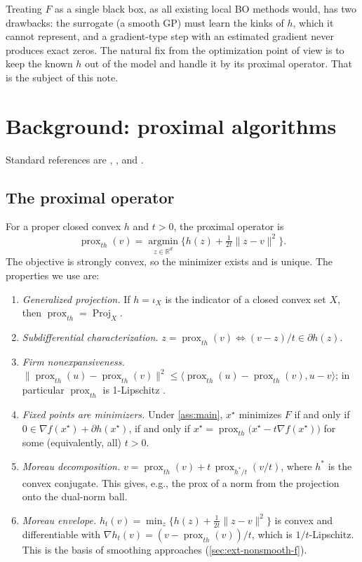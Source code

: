 \documentclass[10pt]{article}
\newcommand{\R}{\mathbb{R}}
\newcommand{\prox}{\operatorname{prox}}
\newcommand{\proj}{\operatorname{Proj}}
\theoremstyle{remark}
\begin{document}
Treating $F$ as a single black box, as all existing local BO methods would, has two drawbacks: the surrogate (a smooth GP) must learn the
kinks of $h$, which it cannot represent, and a gradient-type step with an estimated gradient never produces exact zeros. The natural fix
from the optimization point of view is to keep the known $h$ out of the model and handle it by its proximal operator. That is the subject of
this note.

\section{Background: proximal algorithms}\label{sec:prox}

Standard references are \citet{parikh2014prox}, \citet{combettes2011prox}, \citet{beck2017book} and \citet{bauschke2017book}.

\subsection{The proximal operator}
For a proper closed convex $h$ and $t>0$, the proximal operator \citep{moreau1965,parikh2014prox} is
\begin{equation}\label{eq:prox}
\prox_{th}(v) = \operatorname*{argmin}_{z\in\R^d}\Big\{ h(z) + \tfrac{1}{2t}\|z-v\|^2 \Big\}.
\end{equation}
The objective is strongly convex, so the minimizer exists and is unique. The properties we use are:
\begin{enumerate}[label=(P\arabic*)]
\item \emph{Generalized projection.} If $h=\iota_X$ is the indicator of a closed convex set $X$, then $\prox_{th}=\proj_X$.
\item \emph{Subdifferential characterization.} $z=\prox_{th}(v)\iff (v-z)/t\in\partial h(z)$.
\item \emph{Firm nonexpansiveness.} $\|\prox_{th}(u)-\prox_{th}(v)\|^2\le\langle \prox_{th}(u)-\prox_{th}(v),u-v\rangle$; in particular $\prox_{th}$
is 1-Lipschitz \citep{bauschke2017book}.
\item \emph{Fixed points are minimizers.} Under \cref{ass:main}, $x^\star$ minimizes $F$ if and only if
$0\in\nabla f(x^\star)+\partial h(x^\star)$, if and only if $x^\star=\prox_{th}\big(x^\star-t\nabla f(x^\star)\big)$ for some (equivalently, all) $t>0$.
\item \emph{Moreau decomposition.} $v=\prox_{th}(v)+t\,\prox_{h^*/t}(v/t)$, where $h^*$ is the convex conjugate. This gives, e.g., the prox
of a norm from the projection onto the dual-norm ball.
\item \emph{Moreau envelope.} $h_t(v)=\min_z\{h(z)+\frac1{2t}\|z-v\|^2\}$ is convex and differentiable with $\nabla h_t(v)=(v-\prox_{th}(v))/t$,
which is $1/t$-Lipschitz. This is the basis of smoothing approaches (\cref{sec:ext-nonsmooth-f}).
\end{enumerate}
\end{document}

